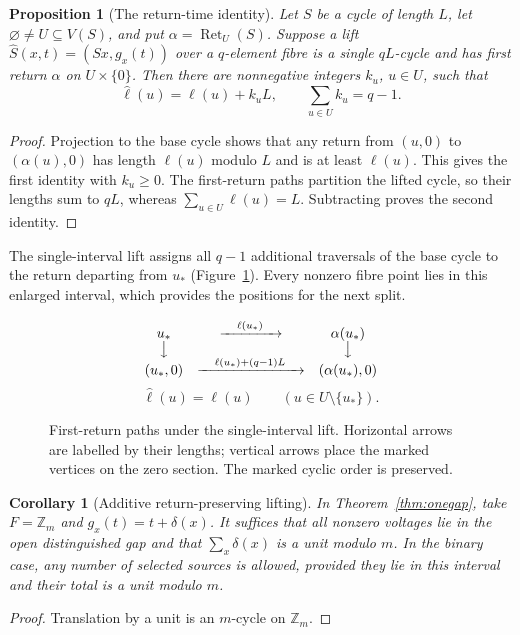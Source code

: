 \documentclass[11pt,reqno]{amsart}
\numberwithin{equation}{section}
\newtheorem{proposition}[theorem]{Proposition}
\newtheorem{corollary}[theorem]{Corollary}
\theoremstyle{definition}
\theoremstyle{remark}
\newcommand{\Zm}{\mathbb Z_m}
\newcommand{\Ret}{\operatorname{Ret}}
\begin{document}
\begin{proposition}[The return-time identity]\label{prop:return-budget}
Let $S$ be a cycle of length $L$, let $\varnothing\ne U\subseteq V(S)$, and put
$\alpha=\Ret_U(S)$. Suppose a lift
$\widehat S(x,t)=(Sx,g_x(t))$ over a $q$-element fibre is a single $qL$-cycle and
has first return $\alpha$ on $U\times\{0\}$. Then there are nonnegative integers
$k_u$, $u\in U$, such that
\begin{equation}\label{eq:return-budget}
 \widehat\ell(u)=\ell(u)+k_uL,
 \qquad \sum_{u\in U}k_u=q-1.
\end{equation}
\end{proposition}
\begin{proof}
Projection to the base cycle shows that any return from $(u,0)$ to
$(\alpha(u),0)$ has length $\ell(u)$ modulo $L$ and is at least $\ell(u)$.
This gives the first identity with $k_u\ge0$. The first-return paths partition
the lifted cycle, so their lengths sum to $qL$, whereas
$\sum_{u\in U}\ell(u)=L$. Subtracting proves the second identity.
\end{proof}

The single-interval lift assigns all $q-1$ additional traversals of the
base cycle to the return departing from $u_*$ (Figure~\ref{fig:onegap}).
Every nonzero fibre point lies in this enlarged interval, which provides
the positions for the next split.

\begin{figure}[htbp]
\centering
\[
\begin{array}{c@{\quad}c@{\quad}c}
 u_* & \xrightarrow{\quad\ell(u_*)\quad} & \alpha(u_*)\\[-1pt]
 \big\downarrow & & \big\downarrow\\[-1pt]
 (u_*,0) & \xrightarrow{\quad\ell(u_*)+(q-1)L\quad} & (\alpha(u_*),0)
\end{array}
\]
\vspace{-5pt}
\[
 \widehat\ell(u)=\ell(u)\qquad(u\in U\setminus\{u_*\}).
\]
\caption{First-return paths under the single-interval lift. Horizontal
arrows are labelled by their lengths; vertical arrows place the marked
vertices on the zero section. The marked cyclic order is preserved.}
\label{fig:onegap}
\end{figure}

\begin{corollary}[Additive return-preserving lifting]\label{cor:additive}
In Theorem~\ref{thm:onegap}, take $F=\Zm$ and $g_x(t)=t+\delta(x)$. It suffices
that all nonzero voltages lie in the open distinguished gap and that
$\sum_x\delta(x)$ is a unit modulo $m$. In the binary case, any number of selected sources is allowed, provided
they lie in this interval and their total is a unit modulo $m$.
\end{corollary}
\begin{proof}
Translation by a unit is an $m$-cycle on $\Zm$.
\end{proof}
\end{document}
